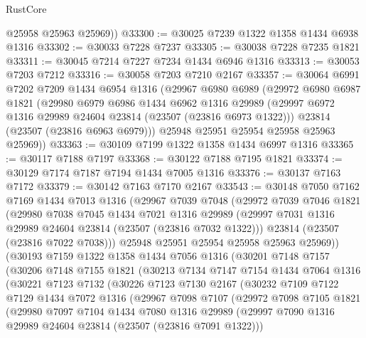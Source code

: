 \begin{lexlean}{RustCore}
\begin{coremodule}
        @25958
        @25963
        @25969))
@33300 := @30025 @7239 @1322 @1358 @1434 @6938 @1316
@33302 := @30033 @7228 @7237
@33305 := @30038 @7228 @7235 @1821
@33311 := @30045 @7214 @7227 @7234 @1434 @6946 @1316
@33313 := @30053 @7203 @7212
@33316 := @30058 @7203 @7210 @2167
@33357 := @30064
    @6991
    @7202
    @7209
    @1434
    @6954
    @1316
    (@29967
      @6980
      @6989
      (@29972
        @6980
        @6987
        @1821
        (@29980
          @6979
          @6986
          @1434
          @6962
          @1316
          @29989
          (@29997 @6972 @1316 @29989 @24604 @23814 (@23507 (@23816 @6973 @1322)))
          @23814
          (@23507 (@23816 @6963 @6979)))
        @25948
        @25951
        @25954
        @25958
        @25963
        @25969))
@33363 := @30109 @7199 @1322 @1358 @1434 @6997 @1316
@33365 := @30117 @7188 @7197
@33368 := @30122 @7188 @7195 @1821
@33374 := @30129 @7174 @7187 @7194 @1434 @7005 @1316
@33376 := @30137 @7163 @7172
@33379 := @30142 @7163 @7170 @2167
@33543 := @30148
    @7050
    @7162
    @7169
    @1434
    @7013
    @1316
    (@29967
      @7039
      @7048
      (@29972
        @7039
        @7046
        @1821
        (@29980
          @7038
          @7045
          @1434
          @7021
          @1316
          @29989
          (@29997 @7031 @1316 @29989 @24604 @23814 (@23507 (@23816 @7032 @1322)))
          @23814
          (@23507 (@23816 @7022 @7038)))
        @25948
        @25951
        @25954
        @25958
        @25963
        @25969))
    (@30193
      @7159
      @1322
      @1358
      @1434
      @7056
      @1316
      (@30201
        @7148
        @7157
        (@30206
          @7148
          @7155
          @1821
          (@30213
            @7134
            @7147
            @7154
            @1434
            @7064
            @1316
            (@30221
              @7123
              @7132
              (@30226
                @7123
                @7130
                @2167
                (@30232
                  @7109
                  @7122
                  @7129
                  @1434
                  @7072
                  @1316
                  (@29967
                    @7098
                    @7107
                    (@29972
                      @7098
                      @7105
                      @1821
                      (@29980
                        @7097
                        @7104
                        @1434
                        @7080
                        @1316
                        @29989
                        (@29997 @7090 @1316 @29989 @24604 @23814 (@23507 (@23816 @7091 @1322)))

\end{coremodule}
\end{lexlean}
